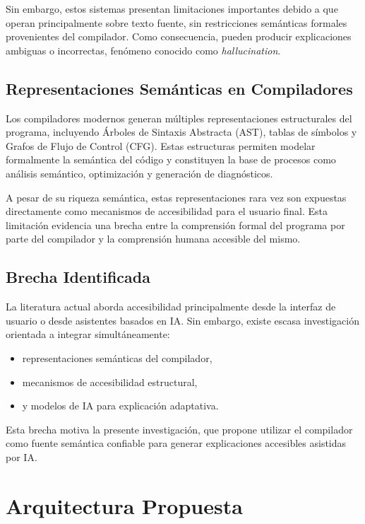 \documentclass[conference]{IEEEtran}
\begin{document}
Sin embargo, estos sistemas presentan limitaciones importantes debido a que operan principalmente sobre texto fuente, sin restricciones semánticas formales provenientes del compilador. Como consecuencia, pueden producir explicaciones ambiguas o incorrectas, fenómeno conocido como \textit{hallucination}.

\subsection{Representaciones Semánticas en Compiladores}

Los compiladores modernos generan múltiples representaciones estructurales del programa, incluyendo Árboles de Sintaxis Abstracta (AST), tablas de símbolos y Grafos de Flujo de Control (CFG). Estas estructuras permiten modelar formalmente la semántica del código y constituyen la base de procesos como análisis semántico, optimización y generación de diagnósticos.

A pesar de su riqueza semántica, estas representaciones rara vez son expuestas directamente como mecanismos de accesibilidad para el usuario final. Esta limitación evidencia una brecha entre la comprensión formal del programa por parte del compilador y la comprensión humana accesible del mismo.

\subsection{Brecha Identificada}

La literatura actual aborda accesibilidad principalmente desde la interfaz de usuario o desde asistentes basados en IA. Sin embargo, existe escasa investigación orientada a integrar simultáneamente:

\begin{itemize}
    \item representaciones semánticas del compilador,
    \item mecanismos de accesibilidad estructural,
    \item y modelos de IA para explicación adaptativa.
\end{itemize}

Esta brecha motiva la presente investigación, que propone utilizar el compilador como fuente semántica confiable para generar explicaciones accesibles asistidas por IA.


\section{Arquitectura Propuesta}
\end{document}
